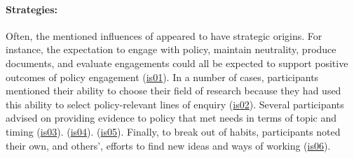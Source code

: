 \paragraph{Strategies:}
Often, the mentioned influences of \skiinst{} appeared to have strategic origins. For instance, the expectation to engage with policy, maintain neutrality, produce documents, and evaluate engagements could all be expected to support positive outcomes of policy engagement (\hyperref[tab:resskiinststrat]{is01}). In a number of cases, participants mentioned their ability to choose their field of research because they had used this ability to select policy-relevant lines of enquiry (\hyperref[tab:resskiinststrat]{is02}). Several participants advised on providing evidence to policy that met needs in terms of topic and timing (\hyperref[tab:resskiinststrat]{is03}).  (\hyperref[tab:resskiinststrat]{is04}).  (\hyperref[tab:resskiinststrat]{is05}). Finally, to break out of habits, participants noted their own, and others', efforts to find new ideas and ways of working (\hyperref[tab:resskiinststrat]{is06}).

\subsubsection{\titinfr}\label{sec:resskiinfr}

